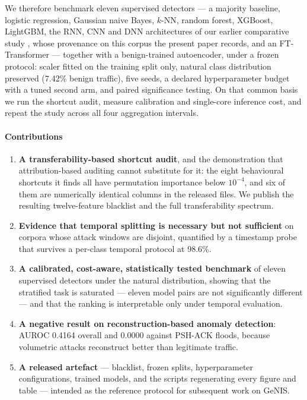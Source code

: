 \documentclass[review,12pt]{elsarticle}
\begin{document}
We therefore benchmark eleven supervised detectors --- a majority baseline, logistic
regression, Gaussian naive Bayes, $k$-NN, random forest, XGBoost, LightGBM, the RNN, CNN
and DNN architectures of our earlier comparative study \cite{bahri2023comparative}, whose
provenance on this corpus the present paper records, and an FT-Transformer
--- together with a benign-trained autoencoder, under a frozen protocol: scaler fitted on
the training split only, natural class distribution preserved (7.42\% benign traffic),
five seeds, a declared hyperparameter budget with a tuned second arm, and paired
significance testing. On that common basis we run the shortcut audit, measure calibration and
single-core inference cost, and repeat the study across all four aggregation intervals.

\paragraph{Contributions}
\begin{enumerate}
  \item \textbf{A transferability-based shortcut audit}, and the demonstration that
  attribution-based auditing cannot substitute for it: the eight behavioural shortcuts
  it finds all have permutation importance below $10^{-4}$, and six of them are
  numerically identical columns in the released files. We publish the resulting
  twelve-feature blacklist and the full transferability spectrum.
  \item \textbf{Evidence that temporal splitting is necessary but not sufficient} on
  corpora whose attack windows are disjoint, quantified by a timestamp probe that
  survives a per-class temporal protocol at 98.6\%.
  \item \textbf{A calibrated, cost-aware, statistically tested benchmark} of eleven
  supervised detectors under the natural distribution, showing that the stratified task is saturated
  --- eleven model pairs are not significantly different --- and that the ranking is
  interpretable only under temporal evaluation.
  \item \textbf{A negative result on recon\-struction-based anomaly detection}: AUROC
  0.4164 overall and 0.0000 against PSH-ACK floods, because volumetric attacks
  reconstruct better than legitimate traffic.
  \item \textbf{A released artefact} --- blacklist, frozen splits, hyperparameter
  configurations, trained models, and the scripts regenerating every figure and table
  --- intended as the reference protocol for subsequent work on GeNIS.
\end{enumerate}
\end{document}
